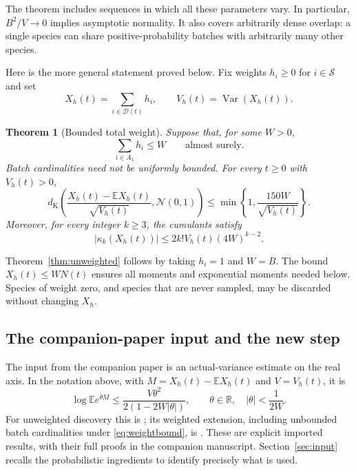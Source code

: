 \documentclass[11pt]{article}
\numberwithin{equation}{section}
\newtheorem{theorem}{Theorem}[section]
\theoremstyle{remark}
\newcommand{\E}{\mathbb E}
\newcommand{\R}{\mathbb R}
\newcommand{\Var}{\operatorname{Var}}
\newcommand{\dK}{d_{\mathrm K}}
\newcommand{\Normal}{\mathcal N(0,1)}
\begin{document}
The theorem includes sequences in which all these parameters vary. In
particular, $B^2/V\to0$ implies asymptotic normality. It also covers arbitrarily
dense overlap: a single species can share positive-probability batches with
arbitrarily many other species.

Here is the more general statement proved below. Fix weights $h_i\ge0$ for
$i\in\mathcal S$ and set
\[
 X_h(t)=\sum_{i\in\mathcal D(t)}h_i,
 \qquad V_h(t)=\Var(X_h(t)).
\]

\begin{theorem}[Bounded total weight]\label{thm:weighted}
Suppose that, for some $W>0$,
\begin{equation}\label{eq:weightbound}
 \sum_{i\in A_1}h_i\le W\qquad\text{almost surely}.
\end{equation}
Batch cardinalities need not be uniformly bounded. For every $t\ge0$ with
$V_h(t)>0$,
\begin{equation}\label{eq:weightedBE}
 \dK\left(\frac{X_h(t)-\E X_h(t)}{\sqrt{V_h(t)}},\Normal\right)
 \le\min\left\{1,\frac{150W}{\sqrt{V_h(t)}}\right\}.
\end{equation}
Moreover, for every integer $k\ge3$, the cumulants satisfy
\begin{equation}\label{eq:maincumulants}
 |\kappa_k(X_h(t))|\le2k!V_h(t)(4W)^{k-2}.
\end{equation}
\end{theorem}

Theorem~\ref{thm:unweighted} follows by taking $h_i=1$ and $W=B$.
The bound $X_h(t)\le WN(t)$ ensures all moments and exponential moments needed
below. Species of weight zero, and species that are never sampled, may be
discarded without changing $X_h$.

\subsection*{The companion-paper input and the new step}

The input from the companion paper is an actual-variance estimate on the real
axis. In the notation above, with $M=X_h(t)-\E X_h(t)$ and $V=V_h(t)$, it is
\begin{equation}\label{eq:realmgf}
 \log\E e^{\theta M}
 \le\frac{V\theta^2}{2(1-2W|\theta|)},
 \qquad \theta\in\R,\quad |\theta|<\frac1{2W}.
\end{equation}
For unweighted discovery this is
\cite[Proposition~9.1]{LongCompanion}; its weighted extension, including
unbounded batch cardinalities under \eqref{eq:weightbound}, is
\cite[Theorem~11.1]{LongCompanion}. These are explicit imported results,
with their full proofs in the companion manuscript. Section~\ref{sec:input}
recalls the probabilistic ingredients to identify precisely what is used.
\end{document}
